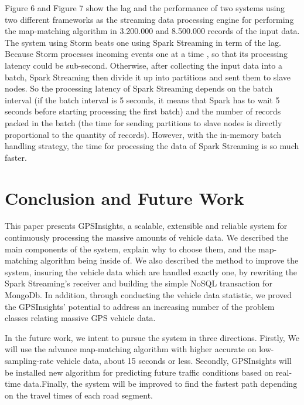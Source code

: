 \documentclass{acm_proc_article-sp}
\begin{document}
Figure 6 and Figure 7 show the lag and the performance of two systems using two different frameworks as the streaming data processing engine for performing the map-matching algorithm in 3.200.000 and 8.500.000 records of the input data. The system using Storm beats one using Spark Streaming in term of the lag. Because Storm processes incoming events one at a time , so that its processing latency could be sub-second. Otherwise, after collecting the input data into a batch, Spark Streaming then divide it up into partitions and sent them to slave nodes. So the processing latency of Spark Streaming depends on the batch interval (if the batch interval is 5 seconds, it means that Spark has to wait 5 seconds before starting processing the first batch)  and the number of records packed in the batch (the time for sending partitions to slave nodes is directly proportional to the quantity of records). However, with the in-memory batch handling strategy, the time for processing the data of Spark Streaming is so much faster.	
	

			
\section{Conclusion and Future Work}
This paper presents GPSInsights, a scalable, extensible and reliable system for continuously processing the massive amounts of vehicle data. We described the main components of the system, explain why to choose them, and the map-matching algorithm being inside of. We also described the method to improve the system, insuring the vehicle data which are handled exactly one, by rewriting the Spark Streaming's receiver and building the simple NoSQL transaction for MongoDb. In addition, through conducting the vehicle data statistic, we proved the GPSInsights' potential to address an increasing number of the problem classes relating massive GPS vehicle data.

In the future work, we intent to pursue the system in three directions. Firstly, We will use the advance map-matching algorithm with higher accurate on low-sampling-rate vehicle data, about 15 seconds or less. Secondly, GPSInsights will be installed new algorithm for predicting future traffic conditions based on real-time data.Finally, the system will be improved to find the fastest path depending on the travel times of each road segment.
%

%
%
\appendix
\end{document}
